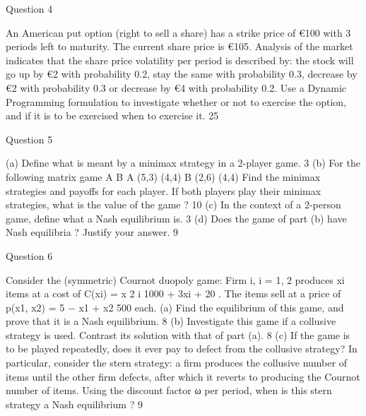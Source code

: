 Question 4 

An American put option (right to sell a share) has a strike price of €100
with 3 periods left to maturity. The current share price is €105. Analysis
of the market indicates that the share price volatility per period is described
by: the stock will go up by €2 with probability 0.2, stay the same with
probability 0.3, decrease by €2 with probability 0.3 or decrease by €4 with
probability 0.2.
Use a Dynamic Programming formulation to investigate whether or not to
exercise the option, and if it is to be exercised when to exercise it. 25 %

Question 5 

(a) Define what is meant by a minimax strategy in a 2-player game. 3 %
(b) For the following matrix game
A B
A (5,3) (4,4)
B (2,6) (4,4)
Find the minimax strategies and payoffs for each player. If both players
play their minimax strategies, what is the value of the game ? 10 %
(c) In the context of a 2-person game, define what a Nash equilibrium is. 3 %
(d) Does the game of part (b) have Nash equilibria ? Justify your answer. 9 %


Question 6 

Consider the (symmetric) Cournot duopoly game: Firm i, i = 1, 2 produces
xi
items at a cost of
C(xi) = x
2
i
1000 + 3xi + 20
. The items sell at a price of
p(x1, x2) = 5 −
x1 + x2
500
each.
(a) Find the equilibrium of this game, and prove that it is a Nash equilibrium.
8 %
(b) Investigate this game if a collusive strategy is used. Contrast its solution
with that of part (a). 8 %
(c) If the game is to be played repeatedly, does it ever pay to defect from
the collusive strategy? In particular, consider the stern strategy: a firm
produces the collusive number of items until the other firm defects,
after which it reverts to producing the Cournot number of items. Using
the discount factor ω per period, when is this stern strategy a Nash
equilibrium ? 9 %
